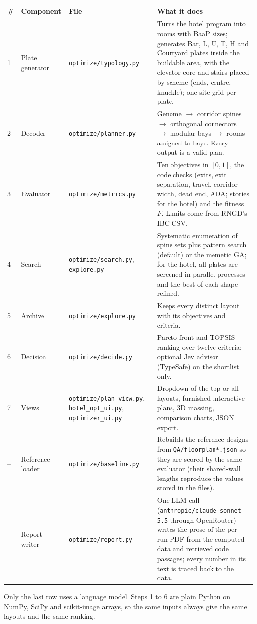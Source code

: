 \documentclass[10pt]{article}
\begin{document}
{\small\begin{longtable}{p{0.5cm}p{3.6cm}p{3.8cm}p{7.6cm}}\toprule
\textbf{\#} & \textbf{Component} & \textbf{File} & \textbf{What it does} \\ \midrule \endhead
1 & Plate generator & \texttt{optimize/typology.py} & Turns the hotel program into rooms with BaaP sizes; generates Bar, L, U, T, H and Courtyard plates inside the buildable area, with the elevator core and stairs placed by scheme (ends, centre, knuckle); one site grid per plate. \\
2 & Decoder & \texttt{optimize/planner.py} & Genome $\to$ corridor spines $\to$ orthogonal connectors $\to$ modular bays $\to$ rooms assigned to bays. Every output is a valid plan. \\
3 & Evaluator & \texttt{optimize/metrics.py} & Ten objectives in $[0,1]$, the code checks (exits, exit separation, travel, corridor width, dead end, ADA; stories for the hotel) and the fitness $F$. Limits come from RNGD's IBC CSV. \\
4 & Search & \texttt{optimize/search.py}, \texttt{explore.py} & Systematic enumeration of spine sets plus pattern search (default) or the memetic GA; for the hotel, all plates are screened in parallel processes and the best of each shape refined. \\
5 & Archive & \texttt{optimize/explore.py} & Keeps every distinct layout with its objectives and criteria. \\
6 & Decision & \texttt{optimize/decide.py} & Pareto front and TOPSIS ranking over twelve criteria; optional Jev advisor (TypeSafe) on the shortlist only. \\
7 & Views & \texttt{optimize/plan\_view.py}, \texttt{hotel\_opt\_ui.py}, \texttt{optimizer\_ui.py} & Dropdown of the top or all layouts, furnished interactive plans, 3D massing, comparison charts, JSON export. \\
-- & Reference loader & \texttt{optimize/baseline.py} & Rebuilds the reference designs from \texttt{QA/floorplan*.json} so they are scored by the same evaluator (their shared-wall lengths reproduce the values stored in the files). \\
-- & Report writer & \texttt{optimize/report.py} & One LLM call (\texttt{anthropic/claude-sonnet-5.5} through OpenRouter) writes the prose of the per-run PDF from the computed data and retrieved code passages; every number in its text is traced back to the data. \\
\bottomrule\end{longtable}}
Only the last row uses a language model. Steps 1 to 6 are plain Python on NumPy, SciPy and scikit-image arrays, so the
same inputs always give the same layouts and the same ranking.
\end{document}
